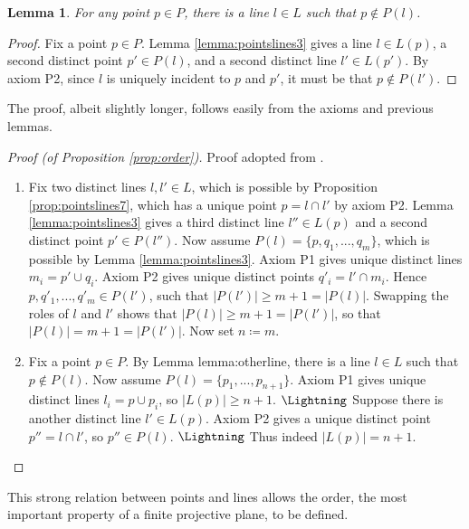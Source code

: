 \documentclass{report}
\newtheorem{lemma}[theorem]{Lemma}
\theoremstyle{definition}\newtheorem*{definition}{Definition}
\theoremstyle{definition}\newtheorem*{example}{Example}
\theoremstyle{remark}\newtheorem*{remark}{Remark}
\begin{document}
\begin{lemma}
\label{lemma:otherline}
For any point $ p \in P $, there is a line $ l \in L $ such that $ p \notin P(l) $.
\end{lemma}

\begin{proof}
Fix a point $ p \in P $. Lemma \ref{lemma:pointslines3} gives a line $ l \in L(p) $, a second distinct point $ p' \in P(l) $, and a second distinct line $ l' \in L(p') $. By axiom P2, since $ l $ is uniquely incident to $ p $ and $ p' $, it must be that $ p \notin P(l') $.
\end{proof}

The proof, albeit slightly longer, follows easily from the axioms and previous lemmas.

\begin{proof}[Proof (of Proposition \ref{prop:order})]
Proof adopted from \cite{geombook}.
\begin{enumerate}[label=(\roman*)]
  \item Fix two distinct lines $ l, l' \in L $, which is possible by Proposition \ref{prop:pointslines7}, which has a unique point $ p = l \cap l' $ by axiom P2. Lemma \ref{lemma:pointslines3} gives a third distinct line $ l'' \in L(p) $ and a second distinct point $ p' \in P(l'') $. Now assume $ P(l) = \{ p, q_1, ..., q_m \} $, which is possible by Lemma \ref{lemma:pointslines3}. Axiom P1 gives unique distinct lines $ m_i = p' \cup q_i $. Axiom P2 gives unique distinct points $ q'_i = l' \cap m_i $. Hence $ p, q'_1, ..., q'_m \in P(l') $, such that $ |P(l')| \ge m + 1 = |P(l)| $. Swapping the roles of $ l $ and $ l' $ shows that $ |P(l)| \ge m + 1 = |P(l')| $, so that $ |P(l)| = m + 1 = |P(l')| $. Now set $ n \coloneqq m $.
  \item Fix a point $ p \in P $. By Lemma {lemma:otherline}, there is a line $ l \in L $ such that $ p \notin P(l) $. Now assume $ P(l) = \{ p_1, ..., p_{n + 1} \} $. Axiom P1 gives unique distinct lines $ l_i = p \cup p_i $, so $ |L(p)| \ge n + 1 $. $ \text{\Lightning} $ Suppose there is another distinct line $ l' \in L(p) $. Axiom P2 gives a unique distinct point $ p'' = l \cap l' $, so $ p'' \in P(l) $. $ \text{\Lightning} $ Thus indeed $ |L(p)| = n + 1 $.
\end{enumerate}
\end{proof}

This strong relation between points and lines allows the order, the most important property of a finite projective plane, to be defined.
\end{document}
